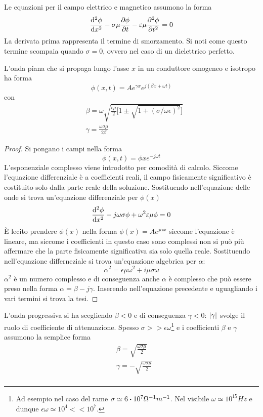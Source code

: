 Le equazioni per il campo elettrico e magnetico assumono la forma
    \[
        \dv[2]{\phi}{x} - \sigma\mu\pdv{\phi}{t} - \varepsilon\mu\pdv[2]{\phi}{t} =0
    \]
La derivata prima rappresenta il termine di smorzamento. Si noti come questo termine scompaia
quando $\sigma=0$, ovvero nel caso di un dielettrico perfetto.
\begin{thm}
L'onda piana che si propaga lungo l'asse $x$ in un conduttore omogeneo e isotropo ha forma
    \[
        \phi(x,t)=A e^{\gamma x} e^{j(\beta x + \omega t)}
    \]
    con
    \[
        \begin{split}
            &\beta=\omega\sqrt{\frac{\epsilon\mu}{2}\bigl[1\pm \sqrt{1+(\sigma/\omega\epsilon)^2}\bigr]}\\
            &\gamma= \frac{\omega\sigma\mu}{2\beta}
        \end{split}
    \]
\end{thm}
\begin{proof}
    Si pongano i campi nella forma
    \[
        \phi(x,t)=\phi{x}e^{-j\omega t}
    \]
    L'esponenziale complesso viene introdotto per comodità di calcolo. Siccome l'equazione differenziale
    è a coefficienti reali, il campo fisicamente significativo è costituito solo dalla parte reale
    della soluzione.
    Sostituendo nell'equazione delle onde si trova un'equazione differenziale per $\phi(x)$
    \[
        \dv[2]{\phi}{x}-j\omega\sigma\phi + \omega^2\varepsilon\mu\phi=0
    \]
    È lecito prendere $\phi(x)$ nella forma $\phi(x)=A e^{j\alpha x}$ siccome l'equazione è lineare, ma siccome i coefficienti
    in questo caso sono complessi non si può più affermare che la parte fisicamente significativa sia solo
    quella reale. Sostituendo nell'equazione differneziale si trova un'equazione algebrica per $\alpha$:
    \[
        \alpha^2=\epsilon\mu\omega^2 + i\mu\sigma\omega
    \]
    $\alpha^2$ è un numero complesso e di conseguenza anche $\alpha$ è complesso che può essere preso
    nella forma $\alpha=\beta-j\gamma$. Inserendo nell'equazione precedente e uguagliando i vari termini
    si trova la tesi.
 \end{proof}
L'onda progressiva si ha scegliendo $\beta<0$ e di conseguenza
$\gamma<0$: $\abs{\gamma}$ svolge il ruolo di coefficiente di attenuazione.
Spesso $\sigma>>\epsilon\omega$\footnote{Ad esempio nel caso del rame $\sigma\simeq6\vdot10^7 \Omega^{-1}m^{-1}$.
Nel visibile $\omega\simeq10^{15}Hz$ e dunque $\epsilon\omega\simeq10^4<<10^7$.}
e i coefficienti $\beta$ e $\gamma$ assumono la semplice forma
\[
    \begin{split}
        &\beta=\sqrt{\frac{\omega\sigma\mu}{2}}\\
        &\gamma=-\sqrt{\frac{\omega\sigma\mu}{2}}\\
    \end{split}
\]

